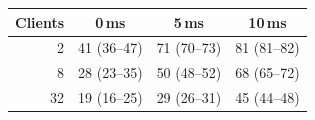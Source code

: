 \begin{tabular}{rccc}
\toprule
Clients & 0\,ms & 5\,ms & 10\,ms \\
\midrule
2 & 41 (36--47) & 71 (70--73) & 81 (81--82) \\
8 & 28 (23--35) & 50 (48--52) & 68 (65--72) \\
32 & 19 (16--25) & 29 (26--31) & 45 (44--48) \\
\bottomrule
\end{tabular}
